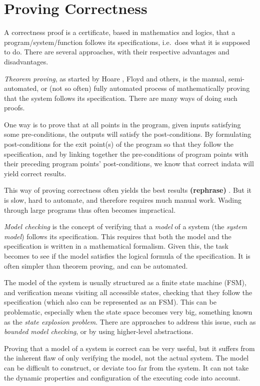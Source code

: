 \documentclass[a4paper,11pt]{kth-mag}
\newcommand{\rephrase}{\textbf{(rephrase)} }
\begin{document}
\section{Proving Correctness} \label{section-proving-correctness}

A correctness proof is a certificate, based in mathematics and logics, that a
program/system/function follows its specifications, i.e.\ does what it is
supposed to do. There are several approaches, with their respective advantages
and disadvantages.

\textit{Theorem proving}, as started by Hoare \cite{hoare69}, Floyd
\cite{floyd67} and others, is the manual, semi-automated, or (not so often)
fully automated process of mathematically proving that the system follows its
specification. There are many ways of doing such proofs.

One way is to prove that at all points in the program, given inputs satisfying
some pre-conditions, the outputs will satisfy the post-conditions. By
formulating post-conditions for the exit point(s) of the program so that they
follow the specification, and by linking together the pre-conditions of program
points with their preceding program points' post-conditions, we know that
correct indata will yield correct results.

This way of proving correctness often yields the best results \rephrase. But it
is slow, hard to automate, and therefore requires much manual work. Wading
through large programs thus often becomes impractical.

\textit{Model checking} is the concept of verifying that a \textit{model} of a
system (the \textit{system model}) follows its specification. This requires
that both the model and the specification is written in a mathematical
formalism. Given this, the task becomes to see if the model satisfies the
logical formula of the specification. It is often simpler than theorem proving,
and can be automated.

The model of the system is usually structured as a finite state machine (FSM),
and verification means visiting all accessible states, checking that they
follow the specification (which also can be represented as an FSM). This can be
problematic, especially when the state space becomes very big, something known
as the \textit{state explosion problem}. There are approaches to address this
issue, such as \textit{bounded model checking}, or by using higher-level
abstractions.

Proving that a model of a system is correct can be very useful, but it suffers
from the inherent flaw of only verifying the model, not the actual system. The
model can be difficult to construct, or deviate too far from the system. It can
not take the dynamic properties and configuration of the executing code into
account.
\end{document}
